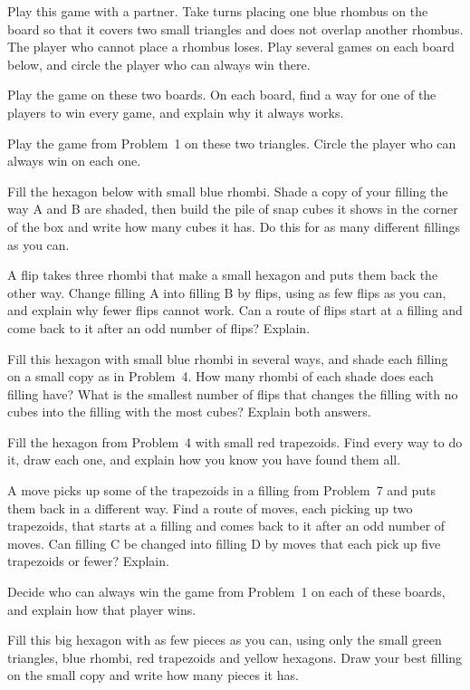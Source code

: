 \documentclass[12pt]{article}
\begin{document}
\problem Play this game with a partner. Take turns placing one blue rhombus on the board so that it covers two small triangles and does not overlap another rhombus. The player who cannot place a rhombus loses. Play several games on each board below, and circle the player who can always win there.

\newpage
\problem Play the game on these two boards. On each board, find a way for one of the players to win every game, and explain why it always works.

\newpage
\problem Play the game from Problem~1 on these two triangles. Circle the player who can always win on each one.

\newpage
\problem Fill the hexagon below with small blue rhombi. Shade a copy of your filling the way A and B are shaded, then build the pile of snap cubes it shows in the corner of the box and write how many cubes it has. Do this for as many different fillings as you can.

\newpage
\problem A flip takes three rhombi that make a small hexagon and puts them back the other way. Change filling A into filling B by flips, using as few flips as you can, and explain why fewer flips cannot work. Can a route of flips start at a filling and come back to it after an odd number of flips? Explain.

\newpage
\problem Fill this hexagon with small blue rhombi in several ways, and shade each filling on a small copy as in Problem~4. How many rhombi of each shade does each filling have? What is the smallest number of flips that changes the filling with no cubes into the filling with the most cubes? Explain both answers.

\newpage
\problem Fill the hexagon from Problem~4 with small red trapezoids. Find every way to do it, draw each one, and explain how you know you have found them all.

\newpage
\problem A move picks up some of the trapezoids in a filling from Problem~7 and puts them back in a different way. Find a route of moves, each picking up two trapezoids, that starts at a filling and comes back to it after an odd number of moves. Can filling C be changed into filling D by moves that each pick up five trapezoids or fewer? Explain.

\newpage
\problem Decide who can always win the game from Problem~1 on each of these boards, and explain how that player wins.

\newpage
\problem Fill this big hexagon with as few pieces as you can, using only the small green triangles, blue rhombi, red trapezoids and yellow hexagons. Draw your best filling on the small copy and write how many pieces it has.
\end{document}
